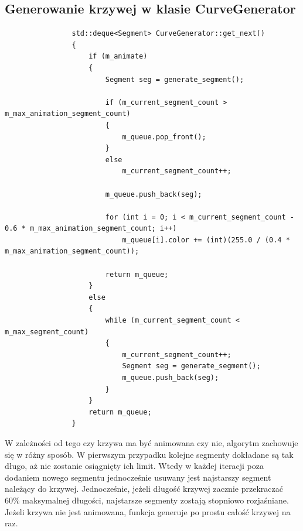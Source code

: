 		\subsection{Generowanie krzywej w klasie CurveGenerator}
			\begin{lstlisting}
				std::deque<Segment> CurveGenerator::get_next()
				{
					if (m_animate)
					{
						Segment seg = generate_segment();
				
						if (m_current_segment_count > m_max_animation_segment_count)
						{
							m_queue.pop_front();
						}
						else
							m_current_segment_count++;
				
						m_queue.push_back(seg);
				
						for (int i = 0; i < m_current_segment_count - 0.6 * m_max_animation_segment_count; i++)
							m_queue[i].color += (int)(255.0 / (0.4 * m_max_animation_segment_count));
				
						return m_queue;
					}
					else
					{
						while (m_current_segment_count < m_max_segment_count)
						{
							m_current_segment_count++;
							Segment seg = generate_segment();
							m_queue.push_back(seg);
						}
					}
					return m_queue;
				}
			\end{lstlisting}
			W zależności od tego czy krzywa ma być animowana czy nie, algorytm zachowuje się w różny sposób.
			W pierwszym przypadku kolejne segmenty dokładane są tak długo, aż nie zostanie osiągnięty ich limit. Wtedy w każdej iteracji poza dodaniem nowego segmentu jednocześnie usuwany jest najstarszy segment należący do krzywej.
			Jednocześnie, jeżeli długość krzywej zacznie przekraczać 60\% maksymalnej długości, najstarsze segmenty zostają stopniowo rozjaśniane.
			Jeżeli krzywa nie jest animowana, funkcja generuje po prostu całość krzywej na raz.

